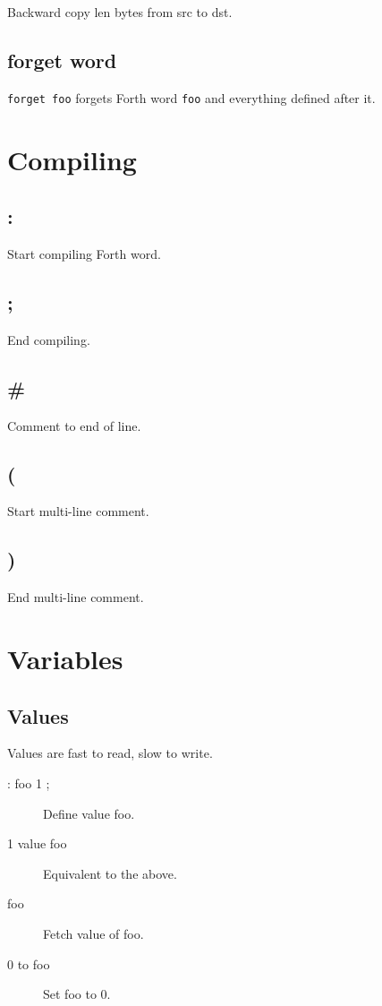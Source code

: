 Backward copy len bytes from src to dst.

\subsection{forget word}

\texttt{forget foo} forgets Forth word \texttt{foo} and everything defined after it.

\section{Compiling}

\subsection{:}

Start compiling Forth word.

\subsection{;}

End compiling.

\subsection{\#}

Comment to end of line.

\subsection{(}

Start multi-line comment.

\subsection{)}

End multi-line comment.


\section{Variables}

\subsection{Values}

Values are fast to read, slow to write.

\begin{description}
\item[: foo 1 ;] Define value foo.
\item[1 value foo] Equivalent to the above.
\item[foo] Fetch value of foo.
\item[0 to foo] Set foo to 0.
\end{description}

